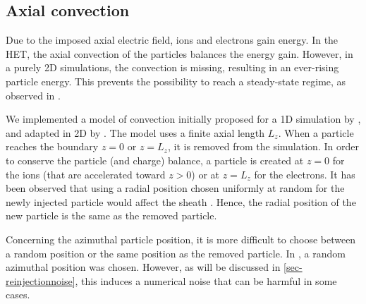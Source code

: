 \subsection{Axial convection}

Due to the imposed axial electric field, ions and electrons gain energy.
In the \ac{HET}, the axial convection of the particles balances the energy gain.
However, in a purely \ac{2D} simulations, the convection is missing, resulting in an ever-rising particle energy.
This prevents the possibility to reach a steady-state regime, as observed in \citet{heron2013,janhunen2018}.

We implemented a model of convection initially proposed for a \ac{1D} simulation by \citet{lafleur2016a}, and adapted in \ac{2D} by \citet{croes2017a}.
The model uses a finite axial length $L_z$.
When a particle reaches the boundary $z=0$ or $z=L_z$, it is removed from the simulation.
In order to conserve the particle (and charge) balance, a particle is created at $z=0$ for the ions (that are accelerated toward $z>0$) or at $z=L_z$ for the electrons.
It has been observed that using a radial position chosen uniformly at random for the newly injected particle would affect the sheath \citep{croes2017a}.
Hence, the radial position of the new particle is the same as the removed particle.

Concerning the azimuthal particle position, it is more difficult to choose between a random position or the same position as the removed particle.
In \citet{lafleur2016a,croes2017a}, a random azimuthal position was chosen.
However, as will be discussed in \cref{sec-reinjectionnoise}, this induces a numerical noise that can be harmful in some cases.
